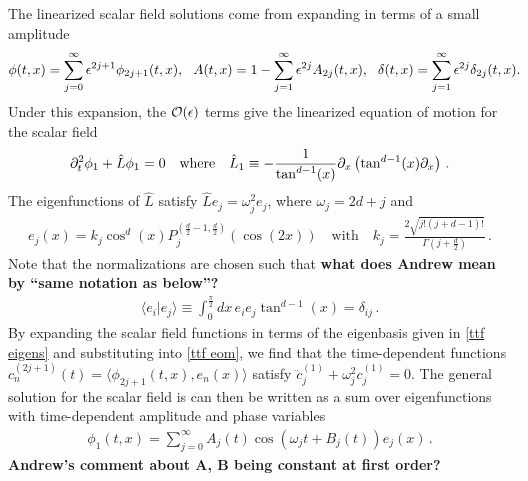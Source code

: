 \documentclass[../PhD.tex]{subfiles}
\begin{document}
The linearized scalar field solutions come from expanding in terms of a small amplitude
\begin{align}
\label{eps expansion}
\phi(t,x) = \sum_{j=0}^\infty \epsilon^{2j+1} \phi_{2j+1}(t,x), \quad \! \! A(t,x) = 1 - \sum_{j=1}^\infty \epsilon^{2j} A_{2j}(t,x), \quad \! \! \delta(t,x) = \sum_{j=1}^\infty \epsilon^{2j} \delta_{2j} (t,x) . \hspace{-0.1in}
\end{align}
Under this expansion, the $\mathcal O(\epsilon)$ terms give the linearized equation of motion for the scalar field
\begin{align}
\label{ttf eom}
\partial^2_t \phi_1 + \hat L \phi_1 = 0 \quad \text{where} \quad \hat L_1 \equiv - \frac{1}{\tan^{d-1}(x)} \partial_x \left( \tan^{d-1}(x) \partial_x \right) \, .
\end{align}
The eigenfunctions of $\hat L$ satisfy $\hat L e_j = \omega^2_j e_j$, where $\omega_j = 2d + j$ and 
\begin{align}
\label{ttf eigens}
e_j (x) = k_j \cos^d (x) P^{(\frac{d}{2} - 1, \frac{d}{2})}_j \left( \cos(2x) \right) \quad \text{with} \quad k_j = \frac{2 \sqrt{j! (j + d - 1)!}}{\Gamma(j + \frac{d}{2})} \, .
\end{align}
Note that the normalizations are chosen such that {\bf what does Andrew mean by ``same notation as below''?}
\begin{align}
\langle e_i | e_j \rangle \equiv \int^{\frac{\pi}{2}}_0 dx \, e_i e_j \tan^{d-1}(x) = \delta_{ij}\, .
\end{align}
By expanding the scalar field functions in terms of the eigenbasis given in \eqref{ttf eigens} and substituting into \eqref{ttf eom}, we find that the time-dependent functions {$c^{(2j + 1)}_n (t) = \langle \phi_{2j + 1}(t,x), e_n (x) \rangle$} satisfy ${\ddot c_j^{(1)} + \omega^2_j c_j^{(1)} = 0}$. The general solution for the scalar field is can then be written as a sum over eigenfunctions with time-dependent amplitude and phase variables
\begin{align}
\label{ttf phi}
\phi_1 (t,x) = \sum_{j=0}^\infty A_j (t) \cos \left(\omega_j t + B_j(t) \right) e_j (x) \, .
\end{align}
{\bf Andrew's comment about A, B being constant at first order?}
\end{document}
